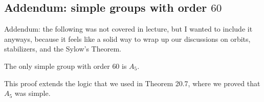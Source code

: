 \subsection{Addendum: simple groups with order $60$}

Addendum: the following was not covered in lecture, but I wanted to include it anyways, because it feels like a solid way to wrap up our discussions on orbits, stabilizers, and the Sylow's Theorem. 

\begin{theorem}
\thmlabel 

The only simple group with order $60$ is $A_5$. 
\end{theorem}

This proof extends the logic that we used in Theorem 20.7, where we proved that $A_5$ was simple.

